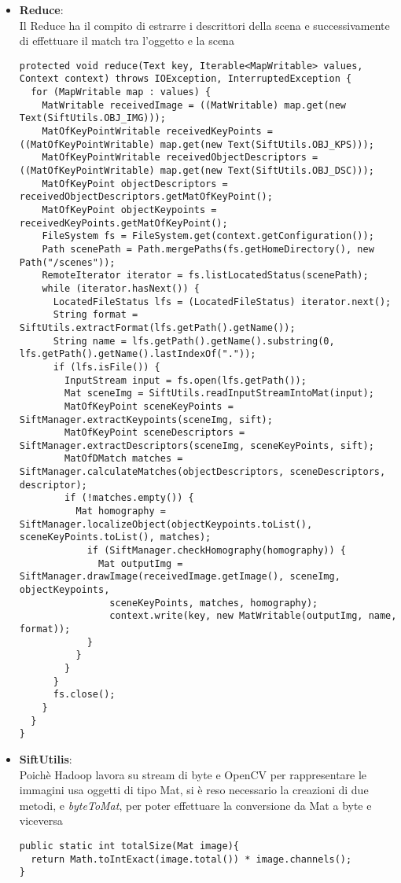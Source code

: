 \begin{itemize}
	\item \textbf{Reduce}:\\
	      Il Reduce ha il compito di estrarre i descrittori della scena e successivamente di effettuare il match tra l'oggetto e la scena
\begin{lstlisting}
protected void reduce(Text key, Iterable<MapWritable> values, Context context) throws IOException, InterruptedException {
  for (MapWritable map : values) {
    MatWritable receivedImage = ((MatWritable) map.get(new Text(SiftUtils.OBJ_IMG)));
    MatOfKeyPointWritable receivedKeyPoints = ((MatOfKeyPointWritable) map.get(new Text(SiftUtils.OBJ_KPS)));
    MatOfKeyPointWritable receivedObjectDescriptors = ((MatOfKeyPointWritable) map.get(new Text(SiftUtils.OBJ_DSC)));
    MatOfKeyPoint objectDescriptors = receivedObjectDescriptors.getMatOfKeyPoint();
    MatOfKeyPoint objectKeypoints = receivedKeyPoints.getMatOfKeyPoint();
    FileSystem fs = FileSystem.get(context.getConfiguration());
    Path scenePath = Path.mergePaths(fs.getHomeDirectory(), new Path("/scenes"));
    RemoteIterator iterator = fs.listLocatedStatus(scenePath);
    while (iterator.hasNext()) {
      LocatedFileStatus lfs = (LocatedFileStatus) iterator.next();
      String format = SiftUtils.extractFormat(lfs.getPath().getName());
      String name = lfs.getPath().getName().substring(0, lfs.getPath().getName().lastIndexOf("."));
      if (lfs.isFile()) {
        InputStream input = fs.open(lfs.getPath());
        Mat sceneImg = SiftUtils.readInputStreamIntoMat(input);
        MatOfKeyPoint sceneKeyPoints = SiftManager.extractKeypoints(sceneImg, sift);
        MatOfKeyPoint sceneDescriptors = SiftManager.extractDescriptors(sceneImg, sceneKeyPoints, sift);
        MatOfDMatch matches = SiftManager.calculateMatches(objectDescriptors, sceneDescriptors, descriptor);
        if (!matches.empty()) {
          Mat homography = SiftManager.localizeObject(objectKeypoints.toList(), sceneKeyPoints.toList(), matches);
            if (SiftManager.checkHomography(homography)) {
              Mat outputImg = SiftManager.drawImage(receivedImage.getImage(), sceneImg, objectKeypoints,
                sceneKeyPoints, matches, homography);
                context.write(key, new MatWritable(outputImg, name, format));
            }
          }
        }
      }
      fs.close();
    }
  }
}
\end{lstlisting}

	\item  \textbf{SiftUtilis}:\\
Poichè Hadoop lavora su stream di byte e OpenCV per rappresentare le immagini usa oggetti di tipo Mat, si è reso necessario la creazioni di due metodi,  e \emph{\textit{byteToMat}}, per poter effettuare la conversione da Mat a byte e viceversa
\begin{lstlisting}
public static int totalSize(Mat image){
  return Math.toIntExact(image.total()) * image.channels();
}


\end{lstlisting}
\end{itemize}
